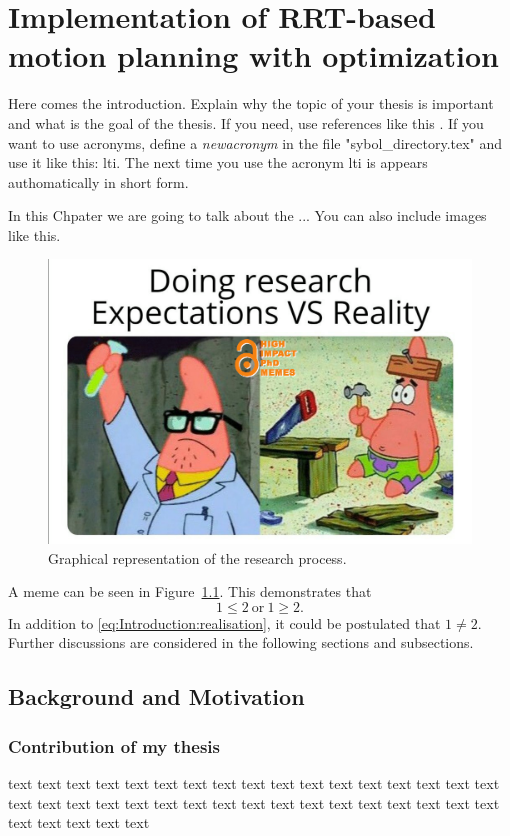 \chapter{Implementation of RRT-based motion planning with optimization } \label{ch:Implementation of RRT-based motion planning with optimization }

Here comes the introduction. Explain why the topic of your thesis is important and what is the goal of the thesis. If you need, use references like this \cite{higham2020handbook}. If you want to use acronyms, define a \textit{newacronym} in the file "sybol\_directory.tex" and use it like this: \gls{lti}. The next time you use the acronym \gls{lti} is appears authomatically in short form.  


In this Chpater we are going to talk about the ...
You can also include images like this.

\begin{figure}[ht!]
    \centering
    \includegraphics[width=\textwidth]{03_images/meme.png}
    \caption{Graphical representation of the research process.}
    \label{fig:Introduction:meme}
\end{figure}


A meme can be seen in Figure~\ref*{fig:Introduction:meme}. This demonstrates that 
\begin{equation} \label{eq:Introduction:realisation}
	1 \le 2 \ \text{or} \ 1 \ge 2.
\end{equation}
In addition to \eqref{eq:Introduction:realisation}, it could be postulated that $1 \ne 2$. Further discussions are considered in the following sections and subsections.

\section{Background and Motivation} \label{sec:Introduction:Background}

\subsection{Contribution of my thesis}

text text text text text text text text text text text text text text text text text text text text text text text text text text text text text text text text text text text text text text text 